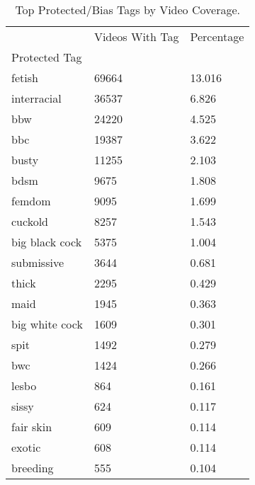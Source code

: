 \begin{table}[htbp]
\centering
\caption{Top Protected/Bias Tags by Video Coverage.}
\label{tab:eda_top_protected_tags}
\begin{tabular}{lll}
\toprule
 & Videos With Tag & Percentage \\
Protected Tag &  &  \\
\midrule
fetish & 69664 & 13.016 \\
interracial & 36537 & 6.826 \\
bbw & 24220 & 4.525 \\
bbc & 19387 & 3.622 \\
busty & 11255 & 2.103 \\
bdsm & 9675 & 1.808 \\
femdom & 9095 & 1.699 \\
cuckold & 8257 & 1.543 \\
big black cock & 5375 & 1.004 \\
submissive & 3644 & 0.681 \\
thick & 2295 & 0.429 \\
maid & 1945 & 0.363 \\
big white cock & 1609 & 0.301 \\
spit & 1492 & 0.279 \\
bwc & 1424 & 0.266 \\
lesbo & 864 & 0.161 \\
sissy & 624 & 0.117 \\
fair skin & 609 & 0.114 \\
exotic & 608 & 0.114 \\
breeding & 555 & 0.104 \\
\bottomrule
\end{tabular}

\end{table}